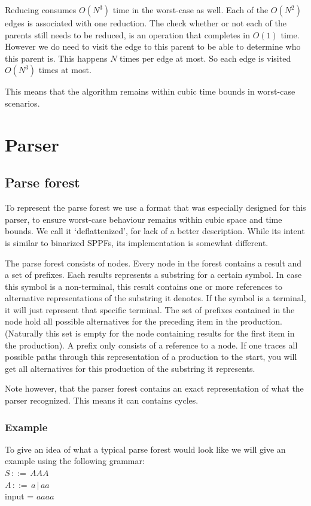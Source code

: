 \documentclass[a4paper,10pt]{article}
\begin{document}
Reducing consumes $O(N^3)$ time in the worst-case as well. Each of the $O(N^2)$ edges is associated with one reduction. The check whether or not each of the parents still needs to be reduced, is an operation that completes in $O(1)$ time. However we do need to visit the edge to this parent to be able to determine who this parent is. This happens $N$ times per edge at most. So each edge is visited $O(N^3)$ times at most.

This means that the algorithm remains within cubic time bounds in worst-case scenarios.

\section{Parser}

\subsection{Parse forest}

To represent the parse forest we use a format that was especially designed for this parser, to ensure worst-case behaviour remains within cubic space and time bounds. We call it `deflattenized', for lack of a better description. While its intent is similar to binarized SPPFs, its implementation is somewhat different.

The parse forest consists of nodes. Every node in the forest contains a result and a set of prefixes. Each results represents a substring for a certain symbol. In case this symbol is a non-terminal, this result contains one or more references to alternative representations of the substring it denotes. If the symbol is a terminal, it will just represent that specific terminal. The set of prefixes contained in the node hold all possible alternatives for the preceding item in the production. (Naturally this set is empty for the node containing results for the first item in the production). A prefix only consists of a reference to a node. If one traces all possible paths through this representation of a production to the start, you will get all alternatives for this production of the substring it represents.

Note however, that the parser forest contains an exact representation of what the parser recognized. This means it can contains cycles.

\subsubsection{Example}
To give an idea of what a typical parse forest would look like we will give an example using the following grammar:\\
$S\,::=\,AAA$\\
$A\,::=\,a\,|\,aa$\\
input = $aaaa$
\end{document}
